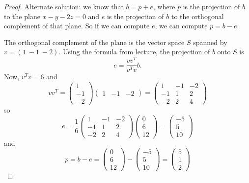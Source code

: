 \documentclass{article}
\theoremstyle{definition}
\begin{document}
\begin{proof}
Alternate solution: we know that $b=p + e$, where $p$ is the projection of $b$ to the plane $x-y-2z=0$ and $e$ is the projection of $b$ to the orthogonal complement of that plane. So if we can compute $e$, we can compute $p=b-e$. 

The orthogonal complement of the plane is the vector space $S$ spanned by $v=(1 \ -1\ -2)$. Using the formula from lecture, the projection of $b$ onto $S$ is
\[e=\frac{v v^T}{v^T v}b.\]
Now, $v^Tv=6$ and 
\[vv^T=\begin{pmatrix}	1\\-1\\-2 \end{pmatrix}\begin{pmatrix}	1&-1&-2 \end{pmatrix}=\begin{pmatrix}
	1&-1&-2\\-1&1&2\\-2&2&4
\end{pmatrix}
\]
so 
\[e=\frac{1}{6}\begin{pmatrix}
	1&-1&-2\\-1&1&2\\-2&2&4
\end{pmatrix}\begin{pmatrix}
0\\6\\12
\end{pmatrix}=\begin{pmatrix}
-5\\5\\10
\end{pmatrix} \]
and 
\[p=b-e=\begin{pmatrix}
	0\\6\\12
\end{pmatrix}-\begin{pmatrix}
	-5\\5\\10
\end{pmatrix}=\begin{pmatrix}
5\\1\\2
\end{pmatrix}\]
\end{proof}
\end{document}
